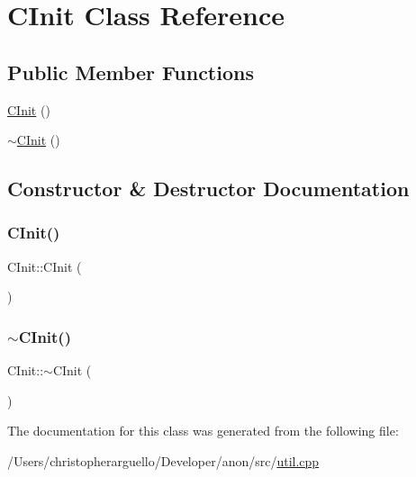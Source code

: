\hypertarget{class_c_init}{}\section{C\+Init Class Reference}
\label{class_c_init}
\subsection*{Public Member Functions}
\begin{DoxyCompactItemize}
\item 
\mbox{\hyperlink{class_c_init_a4be18861132e828f5f0101880d04b706}{C\+Init}} ()
\item 
\mbox{\hyperlink{class_c_init_aa3e8928241211e08a42749f4f49a9c3e}{$\sim$\+C\+Init}} ()
\end{DoxyCompactItemize}


\subsection{Constructor \& Destructor Documentation}
\mbox{\label{class_c_init_a4be18861132e828f5f0101880d04b706}} 
\subsubsection{\texorpdfstring{C\+Init()}{CInit()}}
{\footnotesize\ttfamily C\+Init\+::\+C\+Init (\begin{DoxyParamCaption}{ }\end{DoxyParamCaption})\hspace{0.3cm}{\ttfamily [inline]}}

\mbox{\label{class_c_init_aa3e8928241211e08a42749f4f49a9c3e}} 
\subsubsection{\texorpdfstring{$\sim$\+C\+Init()}{~CInit()}}
{\footnotesize\ttfamily C\+Init\+::$\sim$\+C\+Init (\begin{DoxyParamCaption}{ }\end{DoxyParamCaption})\hspace{0.3cm}{\ttfamily [inline]}}



The documentation for this class was generated from the following file\+:\begin{DoxyCompactItemize}
\item 
/\+Users/christopherarguello/\+Developer/anon/src/\mbox{\hyperlink{util_8cpp}{util.\+cpp}}\end{DoxyCompactItemize}
